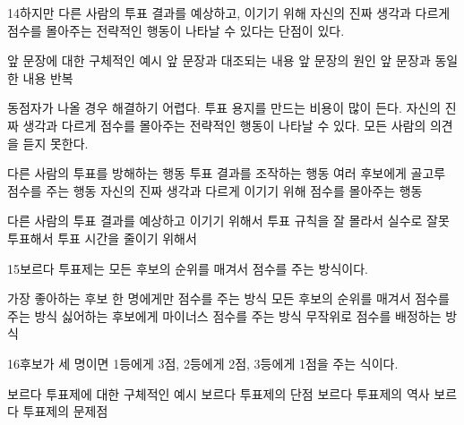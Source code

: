 \documentclass[fs85,seriesRus]{korfarm-base}
\begin{document}
\begin{kfSentenceUnit}{14}{하지만 다른 사람의 투표 결과를 예상하고, 이기기 위해 자신의 진짜 생각과 다르게 점수를 몰아주는 전략적인 행동이 나타날 수 있다는 단점이 있다.}
\begin{kfChoices}
\kfChoice 앞 문장에 대한 구체적인 예시
\kfChoice 앞 문장과 대조되는 내용
\kfChoice 앞 문장의 원인
\kfChoice 앞 문장과 동일한 내용 반복
\end{kfChoices}
\begin{kfChoices}
\kfChoice 동점자가 나올 경우 해결하기 어렵다.
\kfChoice 투표 용지를 만드는 비용이 많이 든다.
\kfChoice 자신의 진짜 생각과 다르게 점수를 몰아주는 전략적인 행동이 나타날 수 있다.
\kfChoice 모든 사람의 의견을 듣지 못한다.
\end{kfChoices}
\begin{kfChoices}
\kfChoice 다른 사람의 투표를 방해하는 행동
\kfChoice 투표 결과를 조작하는 행동
\kfChoice 여러 후보에게 골고루 점수를 주는 행동
\kfChoice 자신의 진짜 생각과 다르게 이기기 위해 점수를 몰아주는 행동
\end{kfChoices}
\begin{kfChoices}
\kfChoice 다른 사람의 투표 결과를 예상하고 이기기 위해서
\kfChoice 투표 규칙을 잘 몰라서
\kfChoice 실수로 잘못 투표해서
\kfChoice 투표 시간을 줄이기 위해서
\end{kfChoices}
\end{kfSentenceUnit}

\begin{kfSentenceUnit}{15}{보르다 투표제는 모든 후보의 순위를 매겨서 점수를 주는 방식이다.}
\begin{kfChoices}
\kfChoice 가장 좋아하는 후보 한 명에게만 점수를 주는 방식
\kfChoice 모든 후보의 순위를 매겨서 점수를 주는 방식
\kfChoice 싫어하는 후보에게 마이너스 점수를 주는 방식
\kfChoice 무작위로 점수를 배정하는 방식
\end{kfChoices}
\end{kfSentenceUnit}

\begin{kfSentenceUnit}{16}{후보가 세 명이면 1등에게 3점, 2등에게 2점, 3등에게 1점을 주는 식이다.}
\begin{kfChoices}
\kfChoice 보르다 투표제에 대한 구체적인 예시
\kfChoice 보르다 투표제의 단점
\kfChoice 보르다 투표제의 역사
\kfChoice 보르다 투표제의 문제점
\end{kfChoices}
\end{kfSentenceUnit}
\end{document}
